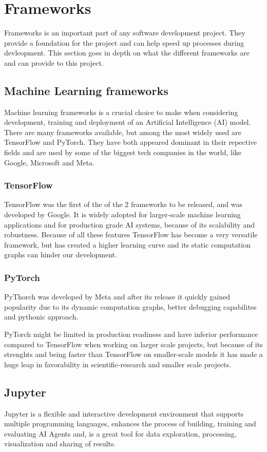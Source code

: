 \section{Frameworks}
\label{sec:Frameworks}

Frameworks is an important part of any software development project. 
They provide a foundation for the project and can help speed up processes 
during devleopment. This section goes in depth on what the different frameworks 
are and can provide to this project.

\subsection{Machine Learning frameworks}

Machine learning frameworks is a crucial choice to make when considering development,
training and deployment of an Artificial Intelligence (AI) model. 
There are many frameworks available, but among the most widely used are TensorFlow
and PyTorch. They have both appeared dominant in their repective fields and are used
by some of the biggest tech companies in the world, like Google, Microsoft and Meta.\cite{PyTorchVsTensorFlow}

\subsubsection{TensorFlow}
TensorFlow was the first of the of the 2 frameworks to be released, 
and was developed by Google. \cite{TensorFlow} It is widely adopted for 
larger-scale machine learning applications and for production grade AI systems, 
because of its scalability and robustness. \cite{simplilearn}
Because of all these features TensorFlow has become a very versatile framework, 
but has created a higher learning curve and its static computation graphs can hinder our development. 


\subsubsection{PyTorch}
PyThorch was developed by Meta and after its release it quickly gained popularity due to its dynamic 
computation graphs, better debugging capabilites and pythonic approach. \cite{PyTorch}

PyTorch might be limited in production readiness and have inferior performance compared to 
TensorFlow when working on larger scale projects, but because of its strenghts and being faster 
than TensorFlow on smaller-scale models it has made a huge leap in favorability in 
scientific-research and smaller scale projects. \cite{simplilearn}

\subsection{Jupyter}
Jupyter is a flexible and interactive development environment that supports multiple 
programming languages, enhances the process of building, training and evaluating AI Agents and,
is a great tool for data exploration, processing, visualization and sharing of results.




